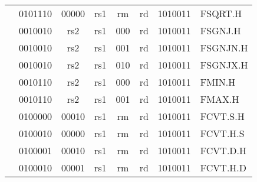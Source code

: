 \begin{table}[p]
\begin{small}
\begin{center}
\begin{tabular}{p{0in}p{0.4in}p{0.05in}p{0.05in}p{0.05in}p{0.05in}p{0.4in}p{0.6in}p{0.4in}p{0.6in}p{0.7in}l}
&
\multicolumn{4}{|c|}{0101110} &
\multicolumn{2}{c|}{00000} &
\multicolumn{1}{c|}{rs1} &
\multicolumn{1}{c|}{rm} &
\multicolumn{1}{c|}{rd} &
\multicolumn{1}{c|}{1010011} & FSQRT.H \\
\cline{2-11}


&
\multicolumn{4}{|c|}{0010010} &
\multicolumn{2}{c|}{rs2} &
\multicolumn{1}{c|}{rs1} &
\multicolumn{1}{c|}{000} &
\multicolumn{1}{c|}{rd} &
\multicolumn{1}{c|}{1010011} & FSGNJ.H \\
\cline{2-11}


&
\multicolumn{4}{|c|}{0010010} &
\multicolumn{2}{c|}{rs2} &
\multicolumn{1}{c|}{rs1} &
\multicolumn{1}{c|}{001} &
\multicolumn{1}{c|}{rd} &
\multicolumn{1}{c|}{1010011} & FSGNJN.H \\
\cline{2-11}


&
\multicolumn{4}{|c|}{0010010} &
\multicolumn{2}{c|}{rs2} &
\multicolumn{1}{c|}{rs1} &
\multicolumn{1}{c|}{010} &
\multicolumn{1}{c|}{rd} &
\multicolumn{1}{c|}{1010011} & FSGNJX.H \\
\cline{2-11}


&
\multicolumn{4}{|c|}{0010110} &
\multicolumn{2}{c|}{rs2} &
\multicolumn{1}{c|}{rs1} &
\multicolumn{1}{c|}{000} &
\multicolumn{1}{c|}{rd} &
\multicolumn{1}{c|}{1010011} & FMIN.H \\
\cline{2-11}


&
\multicolumn{4}{|c|}{0010110} &
\multicolumn{2}{c|}{rs2} &
\multicolumn{1}{c|}{rs1} &
\multicolumn{1}{c|}{001} &
\multicolumn{1}{c|}{rd} &
\multicolumn{1}{c|}{1010011} & FMAX.H \\
\cline{2-11}


&
\multicolumn{4}{|c|}{0100000} &
\multicolumn{2}{c|}{00010} &
\multicolumn{1}{c|}{rs1} &
\multicolumn{1}{c|}{rm} &
\multicolumn{1}{c|}{rd} &
\multicolumn{1}{c|}{1010011} & FCVT.S.H \\
\cline{2-11}


&
\multicolumn{4}{|c|}{0100010} &
\multicolumn{2}{c|}{00000} &
\multicolumn{1}{c|}{rs1} &
\multicolumn{1}{c|}{rm} &
\multicolumn{1}{c|}{rd} &
\multicolumn{1}{c|}{1010011} & FCVT.H.S \\
\cline{2-11}


&
\multicolumn{4}{|c|}{0100001} &
\multicolumn{2}{c|}{00010} &
\multicolumn{1}{c|}{rs1} &
\multicolumn{1}{c|}{rm} &
\multicolumn{1}{c|}{rd} &
\multicolumn{1}{c|}{1010011} & FCVT.D.H \\
\cline{2-11}


&
\multicolumn{4}{|c|}{0100010} &
\multicolumn{2}{c|}{00001} &
\multicolumn{1}{c|}{rs1} &
\multicolumn{1}{c|}{rm} &
\multicolumn{1}{c|}{rd} &
\multicolumn{1}{c|}{1010011} & FCVT.H.D \\
\cline{2-11}



\end{tabular}
\end{center}
\end{small}
\end{table}
